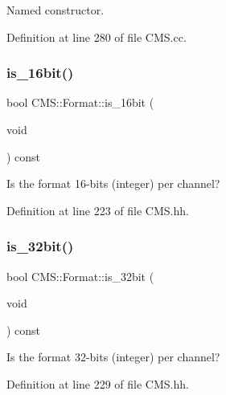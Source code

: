 Named constructor. 



Definition at line 280 of file C\+M\+S.\+cc.

\mbox{\label{class_c_m_s_1_1_format_a67bef287285ae9a4d24d0e27ff5724e4}} 
\subsubsection{\texorpdfstring{is\+\_\+16bit()}{is\_16bit()}}
{\footnotesize\ttfamily bool C\+M\+S\+::\+Format\+::is\+\_\+16bit (\begin{DoxyParamCaption}\item[{void}]{ }\end{DoxyParamCaption}) const\hspace{0.3cm}{\ttfamily [inline]}}



Is the format 16-\/bits (integer) per channel? 



Definition at line 223 of file C\+M\+S.\+hh.

\mbox{\label{class_c_m_s_1_1_format_af049f60718fb989459f8f6831a6b7213}} 
\subsubsection{\texorpdfstring{is\+\_\+32bit()}{is\_32bit()}}
{\footnotesize\ttfamily bool C\+M\+S\+::\+Format\+::is\+\_\+32bit (\begin{DoxyParamCaption}\item[{void}]{ }\end{DoxyParamCaption}) const\hspace{0.3cm}{\ttfamily [inline]}}



Is the format 32-\/bits (integer) per channel? 



Definition at line 229 of file C\+M\+S.\+hh.

\mbox{\label{class_c_m_s_1_1_format_ab7ba1269929ef7c119f541d75e68d569}} 
